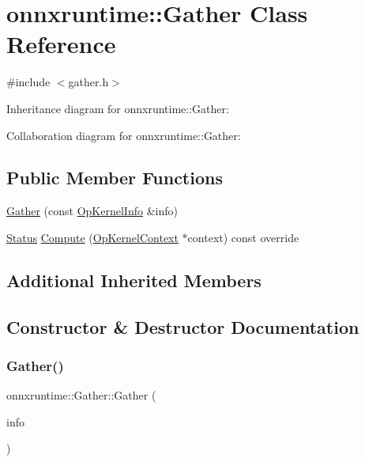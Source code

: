 \hypertarget{classonnxruntime_1_1Gather}{}\section{onnxruntime\+:\+:Gather Class Reference}
\label{classonnxruntime_1_1Gather}


{\ttfamily \#include $<$gather.\+h$>$}



Inheritance diagram for onnxruntime\+:\+:Gather\+:


Collaboration diagram for onnxruntime\+:\+:Gather\+:
\subsection*{Public Member Functions}
\begin{DoxyCompactItemize}
\item 
\mbox{\hyperlink{classonnxruntime_1_1Gather_a91ee0f9bd35608e2adb09cca7e580320}{Gather}} (const \mbox{\hyperlink{classonnxruntime_1_1OpKernelInfo}{Op\+Kernel\+Info}} \&info)
\item 
\mbox{\hyperlink{classonnxruntime_1_1common_1_1Status}{Status}} \mbox{\hyperlink{classonnxruntime_1_1Gather_afd735d74b56aa994eccd98ee325aa4ba}{Compute}} (\mbox{\hyperlink{classonnxruntime_1_1OpKernelContext}{Op\+Kernel\+Context}} $\ast$context) const override
\end{DoxyCompactItemize}
\subsection*{Additional Inherited Members}


\subsection{Constructor \& Destructor Documentation}
\mbox{\label{classonnxruntime_1_1Gather_a91ee0f9bd35608e2adb09cca7e580320}} 
\subsubsection{\texorpdfstring{Gather()}{Gather()}}
{\footnotesize\ttfamily onnxruntime\+::\+Gather\+::\+Gather (\begin{DoxyParamCaption}\item[{const \mbox{\hyperlink{classonnxruntime_1_1OpKernelInfo}{Op\+Kernel\+Info}} \&}]{info }\end{DoxyParamCaption})\hspace{0.3cm}{\ttfamily [inline]}}



